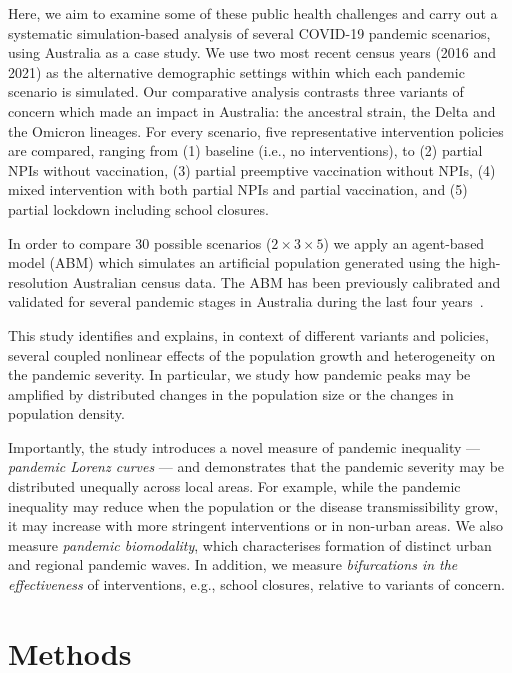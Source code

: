 \documentclass{article}
\begin{document}
Here, we aim to examine some of these public health challenges and carry out a systematic simulation-based analysis of several COVID-19 pandemic scenarios, using Australia as a case study. We use two most recent census years (2016 and 2021) as the alternative demographic settings within which each pandemic scenario is simulated. Our comparative analysis contrasts three variants of concern which made an impact in Australia: the ancestral strain, the Delta and the Omicron lineages.  For every scenario, five representative intervention policies are compared, ranging from (1) baseline (i.e., no interventions), to (2) partial NPIs without vaccination, (3) partial preemptive vaccination without NPIs, (4) mixed intervention with both partial NPIs and partial vaccination, and (5) partial lockdown including school closures. 

In order to compare 30 possible scenarios ($2 \times 3 \times 5$) we apply an agent-based model (ABM) which simulates an artificial population generated using the high-resolution Australian census data. %
The ABM has been previously calibrated and validated for several pandemic stages in Australia during the last four years~\cite{chang_modelling_2020,zachreson_how_2021,chang_simulating_2022,nguyen_general_2022,chang_persistence_2023}.

This study identifies and explains, in context of different variants and policies, several coupled nonlinear effects of the population growth and heterogeneity on the pandemic severity. In particular, we study how pandemic peaks may be amplified by distributed changes in the population size or the changes in population density.

Importantly, the study introduces a novel measure of pandemic inequality --- \textit{pandemic Lorenz curves} --- and demonstrates that the pandemic severity may be distributed unequally across local areas. For example, while the pandemic inequality may reduce when the population or the disease transmissibility grow, it may increase with more stringent interventions or in non-urban areas. We also measure \textit{pandemic biomodality}, which characterises formation of distinct urban and regional pandemic waves. In addition, we measure \textit{bifurcations in the effectiveness} of interventions, e.g., school closures, relative to variants of concern.

\section{Methods}
\label{sec:methods}
\end{document}

